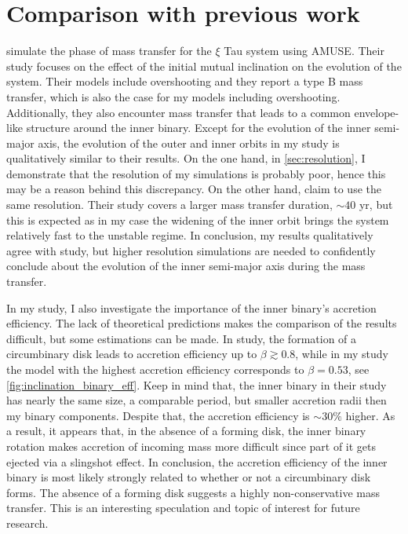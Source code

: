 \section{Comparison with previous work}

\cite{de2014evolution} simulate the phase of mass transfer for the $\xi$ Tau system using AMUSE. Their study focuses on the effect of the initial mutual inclination on the evolution of the system. Their models include overshooting and they report a type B mass transfer, which is also the case for my models including overshooting. Additionally, they also encounter mass transfer that leads to a common envelope-like structure around the inner binary. Except for the evolution of the inner semi-major axis, the evolution of the outer and inner orbits in my study is qualitatively similar to their results. On the one hand, in \cref{sec:resolution}, I demonstrate that the resolution of my simulations is probably poor, hence this may be a reason behind this discrepancy. On the other hand, \cite{de2014evolution} claim to use the same resolution. Their study covers a larger mass transfer duration, $\sim 40$ yr, but this is expected as in my case the widening of the inner orbit brings the system relatively fast to the unstable regime. In conclusion, my results qualitatively agree with \cite{de2014evolution} study, but higher resolution simulations are needed to confidently conclude about the evolution of the inner semi-major axis during the mass transfer.

In my study, I also investigate the importance of the inner binary's accretion efficiency. The lack of theoretical predictions makes the comparison of the results difficult, but some estimations can be made. In \cite{zwart2019triple} study, the formation of a circumbinary disk leads to accretion efficiency up to $\beta \gtrsim 0.8$, while in my study the model with the highest accretion efficiency corresponds to $\beta = 0.53$, see \cref{fig:inclination_binary_eff}. Keep in mind that, the inner binary in their study has nearly the same size, a comparable period, but smaller accretion radii then my binary components. Despite that, the accretion efficiency is $\sim 30\%$ higher. As a result, it appears that, in the absence of a forming disk, the inner binary rotation makes accretion of incoming mass more difficult since part of it gets ejected via a slingshot effect. In conclusion, the accretion efficiency of the inner binary is most likely strongly related to whether or not a circumbinary disk forms. The absence of a forming disk suggests a highly non-conservative mass transfer. This is an interesting speculation and topic of interest for future research.

